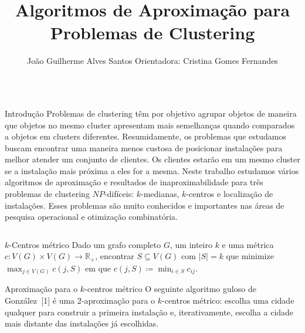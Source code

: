 \documentclass[final]{beamer}
\title{Algoritmos de Aproximação para Problemas de Clustering}
\author{João Guilherme Alves Santos \hspace{100pt} Orientadora: Cristina Gomes Fernandes}
\institute{\vspace{10pt}{\large Departamento de Ciência da Computação,
Instituto de Matemática e Estatística, Universidade de São Paulo}}
\newcommand{\NP}{\mathit{NP}}
\begin{document}
\begin{frame}[t]
\begin{columns}[t] %
\begin{column}{.9\paperwidth}%
	\begin{alertblock}{Introdução}
    Problemas de clustering têm por objetivo agrupar objetos de maneira que objetos no mesmo cluster apresentam mais semelhanças quando comparados a objetos em clusters diferentes. Resumidamente, os problemas que estudamos buscam encontrar uma maneira menos custosa de posicionar instalações para melhor atender um conjunto de clientes. Os clientes estarão em um mesmo cluster se a instalação mais próxima a eles for a mesma. Neste trabalho estudamos vários algoritmos de aproximação e resultados de inaproximabilidade para três problemas de clustering $\NP$-difíceis: $k$-medianas, $k$-centros e localização de instalações. Esses problemas são muito conhecidos e importantes nas áreas de pesquisa operacional e otimização combinatória.
    \end{alertblock}

    \end{column}
\end{columns}
\vspace{1.2cm}

\begin{columns}[t]

  \begin{column}{0.47\paperwidth}

    \begin{alertblock}{$k$-Centros métrico}
      Dado um grafo completo $G$, um inteiro $k$ e uma métrica $c : V(G)\times V(G) \rightarrow \mathbb{R}_+$, encontrar $S \subseteq V(G)$ com $|S| = k$ que minimize $\max_{j \in V(G)} c(j,S)$ em que $c(j,S) \coloneqq \min_{i \in S} c_{ij}$.
    \end{alertblock}
    \begin{block}{Aproximação para o $k$-centros métrico}
      O seguinte algoritmo guloso de González\ [1] é uma 2-aproximação para o $k$-centros métrico: escolha uma cidade qualquer para construir a primeira instalação e, iterativamente, escolha a cidade mais distante das instalações já escolhidas.
      

\end{block}
\end{column}
\end{columns}
\end{frame}
\end{document}
